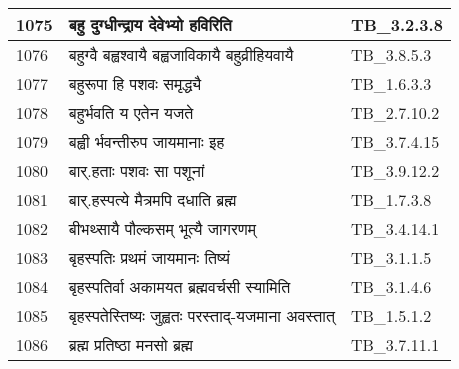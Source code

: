 \documentclass[17pt]{extarticle}
\begin{document}
\begin{longtable}{||p{0.4in}||p{4.9in}||p{0.9in}||}
    \hline
        
    1075 & बहु दुग्धीन्द्राय देवेभ्यो हविरिति & TB\_3.2.3.8       \\
    
    \hline
        
    1076 & बहुग्वै बह्वश्वायै बह्वजाविकायै बहुव्रीहियवायै & TB\_3.8.5.3       \\
    
    \hline
        
    1077 & बहुरूपा हि पशवः समृद्ध्यै & TB\_1.6.3.3       \\
    
    \hline
        
    1078 & बहुर्भवति य एतेन यजते & TB\_2.7.10.2       \\
    
    \hline
        
    1079 & बह्वी र्भवन्तीरुप जायमानाः इह & TB\_3.7.4.15       \\
    
    \hline
        
    1080 & बार्.हताः पशवः सा पशूनां & TB\_3.9.12.2       \\
    
    \hline
        
    1081 & बार्.हस्पत्ये मैत्रमपि दधाति ब्रह्म & TB\_1.7.3.8       \\
    
    \hline
        
    1082 & बीभथ्सायै पौल्कसम् भूत्यै जागरणम् & TB\_3.4.14.1       \\
    
    \hline
        
    1083 & बृहस्पतिः प्रथमं जायमानः तिष्यं & TB\_3.1.1.5       \\
    
    \hline
        
    1084 & बृहस्पतिर्वा अकामयत ब्रह्मवर्चसी स्यामिति & TB\_3.1.4.6       \\
    
    \hline
        
    1085 & बृहस्पतेस्तिष्यः जुह्वतः परस्ताद्{-}यजमाना अवस्तात् & TB\_1.5.1.2       \\
    
    \hline
        
    1086 & ब्रह्म प्रतिष्ठा मनसो ब्रह्म & TB\_3.7.11.1       \\
    
    \hline
        

\end{longtable}
\end{document}
